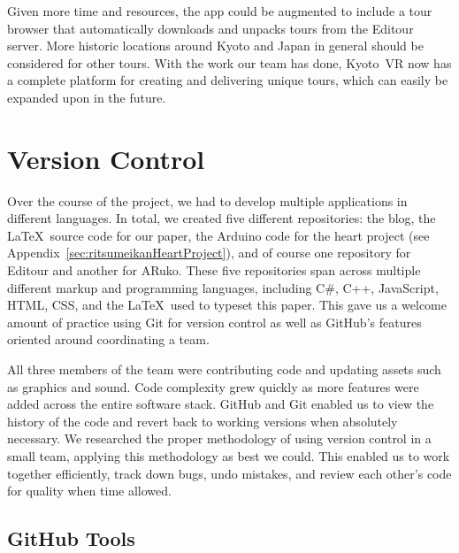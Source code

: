 \documentclass[a4paper, 10pt, american, titlepage]{article}
\begin{document}
Given more time and resources, the app could be augmented to include a tour
browser that automatically downloads and unpacks tours from the Editour server.
More historic locations around Kyoto and Japan in general should be considered
for other tours. With the work our team has done, Kyoto~VR now has a complete
platform for creating and delivering unique tours, which can easily be expanded
upon in the future.

\clearpage

\begin{singlespace}
	\printbibliography
\end{singlespace}

\clearpage

\appendices

\section{Version Control}
\label{sec:versionControl}

Over the course of the project, we had to develop multiple applications in
different languages. In total, we created five different repositories: the blog,
the \LaTeX~source code for our paper, the Arduino code for the heart project
(see Appendix~\ref{sec:ritsumeikanHeartProject}), and of course one repository
for Editour and another for ARuko. These five repositories span across multiple
different markup and programming languages, including C\#, C++, JavaScript,
HTML, CSS, and the \LaTeX~used to typeset this paper. This gave us a welcome
amount of practice using Git for version control as well as GitHub's features
oriented around coordinating a team.

All three members of the team were contributing code and updating assets such as
graphics and sound. Code complexity grew quickly as more features were added
across the entire software stack. GitHub and Git enabled us to view the history
of the code and revert back to working versions when absolutely necessary. We
researched the proper methodology of using version control in a small team,
applying this methodology as best we could. This enabled us to work together
efficiently, track down bugs, undo mistakes, and review each other's code for
quality when time allowed.

\subsection{GitHub Tools}
\label{sec:gitHubTools}
\end{document}
